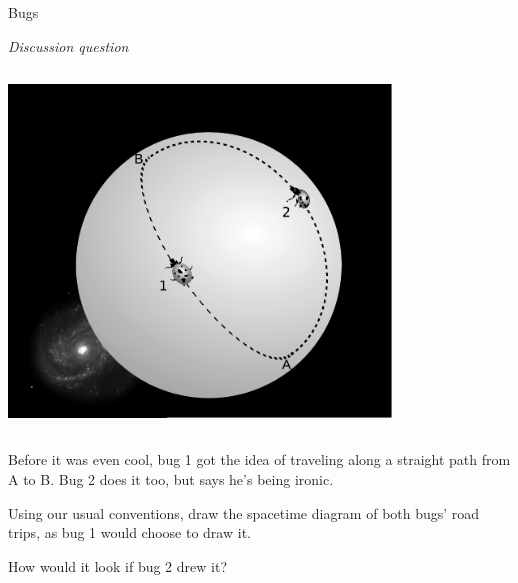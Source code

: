\begin{frame}{Bugs}

\emph{Discussion question}

  \begin{mycolumns}

    \begin{column}{.4\textwidth}\includegraphics[width=4in]{ch09/figs/parable-of-the-bugs.png}\end{column}

    \begin{column}{.6\textwidth}

      Before it was even cool, bug 1 got the idea of traveling along a straight path from A to B.
      Bug 2 does it too, but says he's being ironic.

      \vspace{2mm}

      Using our usual conventions, draw the spacetime diagram of both bugs' road trips, as bug 1 would choose
      to draw it.

      \vspace{2mm}

      How would it look if bug 2 drew it?

    \end{column}
  \end{mycolumns}

\end{frame}


